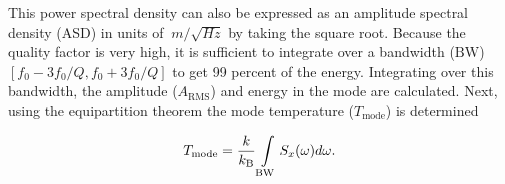 This power spectral density can also be expressed as an amplitude spectral density (ASD) in units of $\SI{}{m/\sqrt{Hz}}$ by taking the square root. Because the quality factor is very high, it is sufficient to integrate over a bandwidth ($\text{BW}$) $\left[ f_0-3f_0/Q, f_0+3f_0/Q \right]$ to get 99 percent of the energy. Integrating over this bandwidth, the amplitude ($A_\text{RMS}$) and energy in the mode are calculated. Next, using the equipartition theorem the mode temperature ($T_\text{mode}$) is determined

\begin{align}
    T_\text{mode} = \frac{k}{k_\text{B}} \int\displaylimits_\text{BW} S_{x}(\omega) d\omega .
\end{align}

